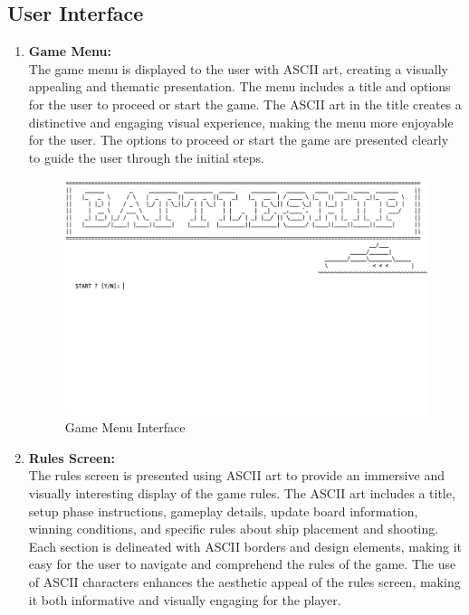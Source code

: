 \newpage

\subsection{User Interface}
\begin{enumerate}
    \item \textbf{Game Menu:} \\
    
    The game menu is displayed to the user with ASCII art, creating a visually appealing and thematic presentation. The menu includes a title and options for the user to proceed or start the game. The ASCII art in the title creates a distinctive and engaging visual experience, making the menu more enjoyable for the user. The options to proceed or start the game are presented clearly to guide the user through the initial steps.\\

    \vspace*{2cm}

    \begin{figure}[H]
        \centering
        \includegraphics[width=15cm]{graphics/menu.jpg}
        \caption{Game Menu Interface}
    \end{figure}

    \newpage
    \item \textbf{Rules Screen:} \\
    
    The rules screen is presented using ASCII art to provide an immersive and visually interesting display of the game rules. The ASCII art includes a title, setup phase instructions, gameplay details, update board information, winning conditions, and specific rules about ship placement and shooting. Each section is delineated with ASCII borders and design elements, making it easy for the user to navigate and comprehend the rules of the game. The use of ASCII characters enhances the aesthetic appeal of the rules screen, making it both informative and visually engaging for the player.\\


\end{enumerate}
